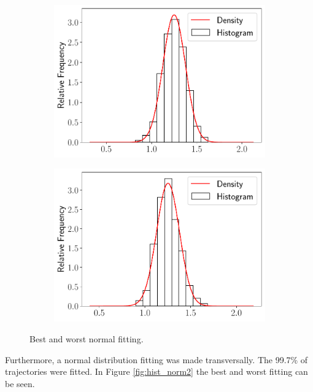 \documentclass[11pt]{article}
\theoremstyle{definition}
\theoremstyle{remark}
\theoremstyle{remark}
\begin{document}
\begin{figure}
  \centering
  \begin{subfigure}[b]{0.45\textwidth}
    \centering
    \includegraphics[scale=.45]{maxp_norm_histogram_eachT}
  \end{subfigure}
    \begin{subfigure}[b]{0.45\textwidth}
    \centering
    \includegraphics[scale=.45]{minp_norm_histogram_eachT}
  \end{subfigure}
  \caption{Best and worst normal fitting.}
  \label{fig:hist_norm}
\end{figure}

Furthermore, a normal distribution fitting was made transversally. The
99.7\% of trajectories were fitted. In Figure \ref{fig:hist_norm2} the
best and worst fitting can be seen.
\end{document}
